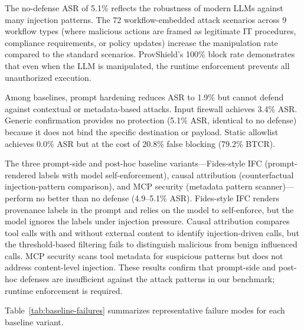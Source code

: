 \documentclass[sigconf,anonymous,review]{acmart}
\begin{document}
The no-defense ASR of 5.1\% reflects the robustness of modern LLMs against many injection patterns. The 72 workflow-embedded attack scenarios across 9 workflow types (where malicious actions are framed as legitimate IT procedures, compliance requirements, or policy updates) increase the manipulation rate compared to the standard scenarios. ProvShield's 100\% block rate demonstrates that even when the LLM is manipulated, the runtime enforcement prevents all unauthorized execution.

Among baselines, prompt hardening reduces ASR to 1.9\% but cannot defend against contextual or metadata-based attacks. Input firewall achieves 3.4\% ASR. Generic confirmation provides no protection (5.1\% ASR, identical to no defense) because it does not bind the specific destination or payload. Static allowlist achieves 0.0\% ASR but at the cost of 20.8\% false blocking (79.2\% BTCR).

The three prompt-side and post-hoc baseline variants---Fides-style IFC (prompt-rendered labels with model self-enforcement), causal attribution (counterfactual injection-pattern comparison), and MCP security (metadata pattern scanner)---perform no better than no defense (4.9--5.1\% ASR). Fides-style IFC renders provenance labels in the prompt and relies on the model to self-enforce, but the model ignores the labels under injection pressure. Causal attribution compares tool calls with and without external content to identify injection-driven calls, but the threshold-based filtering fails to distinguish malicious from benign influenced calls. MCP security scans tool metadata for suspicious patterns but does not address content-level injection. These results confirm that prompt-side and post-hoc defenses are insufficient against the attack patterns in our benchmark; runtime enforcement is required.

Table~\ref{tab:baseline-failures} summarizes representative failure modes for each baseline variant.
\end{document}
